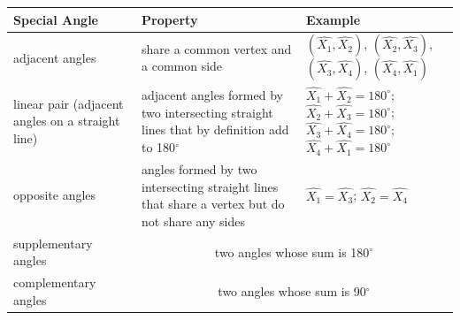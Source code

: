 \begin{table}[H]
\begin{center}


\tablelasttail{}
\begin{tabular}{|l|l|l|}\hline
Special Angle &
Property &
Example%
\\ \hline
adjacent angles &
share a common vertex and a common side &
$(\hat{{X}_{1}},\hat{{X}_{2}})$, $(\hat{{X}_{2}},\hat{{X}_{3}})$, $(\hat{{X}_{3}},\hat{{X}_{4}})$, $(\hat{{X}_{4}},\hat{{X}_{1}})$%
\\ \hline
linear pair (adjacent angles on a straight line) &
adjacent angles formed by two intersecting straight lines that by definition add to 180$^{\circ }$ &
    $\hat{{X}_{1}}+\hat{{X}_{2}}={180}^{\circ }$;
    $\hat{{X}_{2}}+\hat{{X}_{3}}={180}^{\circ }$;
    $\hat{{X}_{3}}+\hat{{X}_{4}}={180}^{\circ }$;
    $\hat{{X}_{4}}+\hat{{X}_{1}}={180}^{\circ }$
\\ \hline
opposite angles &
angles formed by two intersecting straight lines that share a vertex but do not share any sides &
    $\hat{{X}_{1}}=\hat{{X}_{3}}$;
    $\hat{{X}_{2}}=\hat{{X}_{4}}$
\\ \hline
supplementary angles &
\multicolumn{2}{c|}{two angles whose sum is 180$^{\circ }$}
\\ \hline
complementary angles &
\multicolumn{2}{c|}{two angles whose sum is 90$^{\circ }$}
\\ \hline
\end{tabular}
\end{center}
\end{table}
\par

